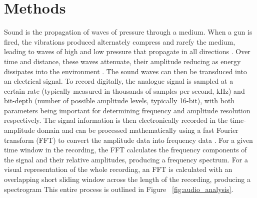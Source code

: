 
\chapter{Methods} %

\label{Methods} %


Sound is the propagation of waves of pressure through a medium. When a gun is fired, the vibrations produced alternately compress and rarefy the medium, leading to waves of high and low pressure that propagate in all directions \citep{Bradbury2011}. Over time and distance, these waves attenuate, their amplitude reducing as energy dissipates into the environment \citep{Russ2013}. The sound waves can then be transduced into an electrical signal.  To record digitally, the analogue signal is sampled at a certain rate (typically measured in thousands of samples per second, kHz) and bit-depth (number of possible amplitude levels, typically 16-bit), with both parameters being important for determining frequency and amplitude resolution respectively. The signal information is then electronically recorded in the time-amplitude domain and can be processed mathematically using a fast Fourier transform (FFT) to convert the amplitude data into frequency data \citep{Fourier1822, Cooley1964}. For a given time window in the recording, the FFT calculates the frequency components of the signal and their relative amplitudes, producing a frequency spectrum. For a visual representation of the whole recording, an FFT is calculated with an overlapping short sliding window across the length of the recording, producing a spectrogram \citep{TheRoy2003} This entire process is outlined in Figure ~\ref{fig:audio_analysis}.\\

